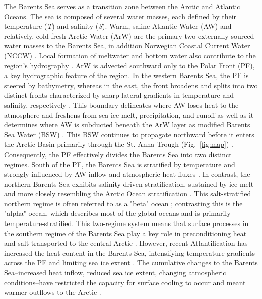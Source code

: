 \documentclass[draft]{agujournal2019}
\begin{document}
The Barents Sea serves as a transition zone between the Arctic and Atlantic Oceans. The sea is composed of several water masses, each defined by their temperature (\emph{T}) and salinity (\emph{S}). Warm, saline Atlantic Water (AW) and relatively, cold fresh Arctic Water (ArW) are the primary two externally-sourced water masses to the Barents Sea, in addition Norwegian Coastal Current Water (NCCW) \cite{Loeng1991,Smedsrud2010}. Local formation of meltwater and bottom water also contribute to the region's hydrography \cite{Oziel2016}. ArW is advected southward only to the Polar Front (PF), a key hydrographic feature of the region. In the western Barents Sea, the PF is steered by bathymetry, whereas in the east, the front broadens and splits into two distinct fronts characterized by sharp lateral gradients in temperature and salinity, respectively \cite{Oziel2016}. This boundary delineates where AW loses heat to the atmosphere and freshens from sea ice melt, precipitation, and runoff as well as it determines where AW is subducted beneath the ArW layer as modified Barents Sea Water (BSW) \cite{Oziel2016,Barton18}. This BSW continues to propagate northward before it enters the Arctic Basin primarily through the St. Anna Trough (Fig.~\ref{fig:map}) \cite{schauer2002}. Consequently, the PF effectively divides the Barents Sea into two distinct regimes. South of the PF, the Barents Sea is stratified by temperature and strongly influenced by AW inflow and atmospheric heat fluxes \cite{Hakkinen2009}. In contrast, the northern Barents Sea exhibits salinity-driven stratification, sustained by ice melt and more closely resembling the Arctic Ocean stratification \cite{kolas2024}. This salt-stratified northern regime is often referred to as a "beta" ocean \cite{Nansen1902,Carmack2007,Stewart2016}; contrasting this is the "alpha" ocean, which describes most of the global oceans and is primarily temperature-stratified. This two-regime system means that surface processes in the southern regime of the Barents Sea play a key role in preconditioning heat and salt transported to the central Arctic \cite{Parsons1996,Munk1998,Garrett2003,Vage2014,kolas2024}. However, recent Atlantification has increased the heat content in the Barents Sea, intensifying temperature gradients across the PF and limiting sea ice extent \cite{Barton18}. The cumulative changes to the Barents Sea--increased heat inflow, reduced sea ice extent, changing atmospheric conditions--have restricted the capacity for surface cooling to occur and meant warmer outflows to the Arctic \cite{Skagseth2020}.
\end{document}
